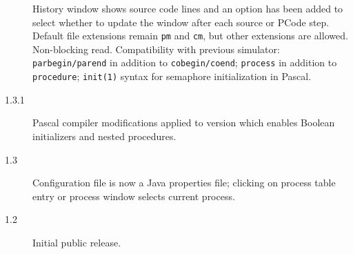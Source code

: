 \documentclass[11pt]{article}
\newcommand{\p}[1]{\texttt{#1}}
\begin{document}
\begin{description}
History window shows source code lines and an option has been added to select
whether to update the window after each source or PCode step.
Default file extensions remain \p{pm} and \p{cm}, but other extensions are allowed.
Non-blocking read.
Compatibility with previous simulator: \p{parbegin/parend} in addition to
\p{cobegin/coend}; \p{process} in addition to \p{procedure}; \p{init(1)} syntax
for semaphore initialization in Pascal.
\item[1.3.1] Pascal compiler modifications applied to version which
enables Boolean initializers and nested procedures.
\item[1.3] Configuration file is now a Java properties file;
clicking on process table entry or process window selects current process.
\item[1.2] Initial public release.
\end{description}
\end{document}

